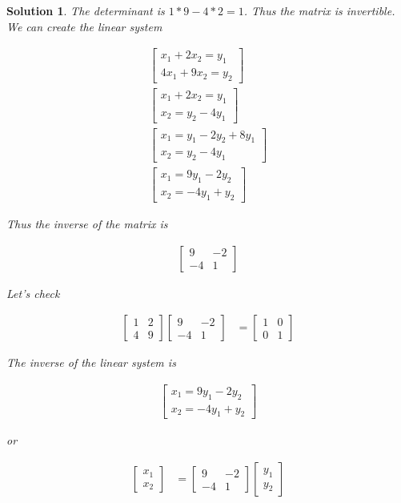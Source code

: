 \documentclass{article}
\newtheorem*{solution}{Solution}
\begin{document}
\begin{solution}
The determinant is  $1 * 9 - 4 * 2 = 1$. Thus the matrix is invertible. We can create the linear system

\begin{align*}
\begin{bmatrix}
x_{1} + 2x_{2} = y_{1} \\
4x_{1} + 9x_{2} = y_{2}
\end{bmatrix} \\
\begin{bmatrix}
x_{1} + 2x_{2} = y_{1} \\
x_{2} = y_{2} - 4y_{1}
\end{bmatrix} \\
\begin{bmatrix}
x_{1} = y_{1} - 2y_{2} + 8y_{1} \\
x_{2} = y_{2} - 4y_{1}
\end{bmatrix} \\
\begin{bmatrix}
x_{1} = 9y_{1} - 2y_{2} \\
x_{2} = -4y_{1} + y_{2}
\end{bmatrix} 
\end{align*}

Thus the inverse of the matrix is

\begin{align*}
\begin{bmatrix}
9 & -2 \\ -4 & 1
\end{bmatrix}
\end{align*}

Let's check

\begin{align*}
\begin{bmatrix}
1 & 2 \\ 4 & 9
\end{bmatrix}
\begin{bmatrix}
9 & -2 \\ -4 & 1
\end{bmatrix} 
&=
\begin{bmatrix}
1 & 0 \\ 0 & 1
\end{bmatrix}
\end{align*}

The inverse of the linear system is 

\begin{align*}
\begin{bmatrix}
x_{1} = 9y_{1} - 2y_{2} \\
x_{2} = -4y_{1} + y_{2}
\end{bmatrix} 
\end{align*}

or 

\begin{align*}
\begin{bmatrix} x_{1} \\ x_{2} \end{bmatrix}
&= 
\begin{bmatrix}
9 & -2 \\ -4 & 1
\end{bmatrix} 
\begin{bmatrix}
y_{1} \\ y_{2}
\end{bmatrix}
\end{align*}

\end{solution}
\end{document}

